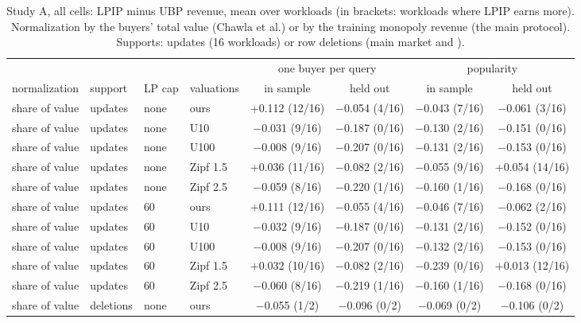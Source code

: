 
\begin{table}[tp]
  \centering
  \footnotesize
  \caption{Study A, all cells: LPIP minus UBP revenue, mean over workloads (in brackets: workloads where LPIP earns more). Normalization by the buyers' total value (Chawla et al.) or by the training monopoly revenue (the main protocol). Supports: \qirana{} updates (16 workloads) or row deletions (main market and \tpch{}).}
  \label{tab:app-studyA}
  \begin{tabular}{@{}llllcccc@{}}
    \toprule
    & & & & \multicolumn{2}{c}{one buyer per query} & \multicolumn{2}{c}{popularity} \\
    \cmidrule(lr){5-6}\cmidrule(lr){7-8}
    normalization & support & LP cap & valuations & in sample & held out & in sample & held out \\
    \midrule
    share of value & updates & none & ours & +0.112 (12/16) & $-$0.054 (4/16) & $-$0.043 (7/16) & $-$0.061 (3/16) \\
    share of value & updates & none & U10 & $-$0.031 (9/16) & $-$0.187 (0/16) & $-$0.130 (2/16) & $-$0.151 (0/16) \\
    share of value & updates & none & U100 & $-$0.008 (9/16) & $-$0.207 (0/16) & $-$0.131 (2/16) & $-$0.153 (0/16) \\
    share of value & updates & none & Zipf 1.5 & +0.036 (11/16) & $-$0.082 (2/16) & $-$0.055 (9/16) & +0.054 (14/16) \\
    share of value & updates & none & Zipf 2.5 & $-$0.059 (8/16) & $-$0.220 (1/16) & $-$0.160 (1/16) & $-$0.168 (0/16) \\
    \midrule
    share of value & updates & 60 & ours & +0.111 (12/16) & $-$0.055 (4/16) & $-$0.046 (7/16) & $-$0.062 (2/16) \\
    share of value & updates & 60 & U10 & $-$0.032 (9/16) & $-$0.187 (0/16) & $-$0.131 (2/16) & $-$0.152 (0/16) \\
    share of value & updates & 60 & U100 & $-$0.008 (9/16) & $-$0.207 (0/16) & $-$0.132 (2/16) & $-$0.153 (0/16) \\
    share of value & updates & 60 & Zipf 1.5 & +0.032 (10/16) & $-$0.082 (2/16) & $-$0.239 (0/16) & +0.013 (12/16) \\
    share of value & updates & 60 & Zipf 2.5 & $-$0.060 (8/16) & $-$0.219 (1/16) & $-$0.160 (1/16) & $-$0.168 (0/16) \\
    \midrule
    share of value & deletions & none & ours & $-$0.055 (1/2) & $-$0.096 (0/2) & $-$0.069 (0/2) & $-$0.106 (0/2) \\

\end{tabular}
\end{table}
